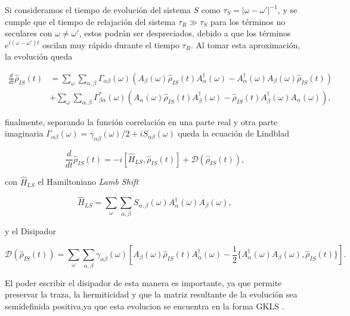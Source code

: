 Si consideramos el tiempo de evolución del sistema $S$ como $\tau_{S}=|\omega-\omega'|^{-1}$, y se cumple que el tiempo de relajación del sistema $\tau_{R}\gg \tau_{S}$ para los términos no seculares con $\omega \neq \omega'$, estos podrán ser despreciados, debido a que los términos $e^{i(\omega-\omega')t}$ oscilan muy rápido durante el tiempo $\tau_{R}$. Al tomar esta aproximación, la evolución queda

\begin{align*}
    \frac{d}{dt}\hat{\rho}_{IS}(t) & = \sum_{\omega}\sum_{\alpha,\beta} \Gamma_{\alpha \beta}(\omega)\left(A_{\beta}(\omega)\hat{\rho}_{IS}(t)A^{\dagger}_{\alpha}(\omega) - A^{\dagger}_{\alpha}(\omega)A_{\beta}(\omega) \hat{\rho}_{IS}(t) \right) \\
    & + \sum_{\omega}\sum_{\alpha,\beta} \Gamma^{*}_{\beta \alpha}(\omega) \left(A_{\alpha}(\omega)\hat{\rho}_{IS}(t)A^{\dagger}_{\beta}(\omega) - \hat{\rho}_{IS}(t)A^{\dagger}_{\beta}(\omega)A_{\alpha}(\omega) \right),
\end{align*}

finalmente, separando la función correlación en una parte real y otra parte imaginaria $\Gamma_{\alpha \beta}(\omega) = \gamma_{\alpha \beta}(\omega)/2 + iS_{\alpha \beta}(\omega)$ queda la ecuación de Lindblad 

\begin{equation}
    \frac{d}{dt} \hat{\rho}_{IS}(t) = -i[\hat{H}_{LS},\hat{\rho}_{IS}(t)] + \mathcal{D}(\hat{\rho}_{IS}(t)),
    \label{seclindbladfinal}
\end{equation}

con $\hat{H}_{LS}$ el Hamiltoniano \textit{Lamb Shift}

\begin{equation*}
    \hat{H}_{LS} = \sum_{\omega} \sum_{\alpha,\beta} S_{\alpha,\beta}(\omega)A^{\dagger}_{\alpha}(\omega)A_{\beta}(\omega), 
\end{equation*}

y el Disipador

\begin{equation*}
    \mathcal{D}(\hat{\rho}_{IS}(t)) = \sum_{\omega}\sum_{\alpha,\beta} \gamma_{\alpha \beta}(\omega) \left[ A_{\beta}(\omega)\hat{\rho}_{IS}(t)A^{\dagger}_{\alpha}(\omega) - \frac{1}{2}\{A^{\dagger}_{\alpha}(\omega)A_{\beta}(\omega), \hat{\rho}_{IS}(t)  \} \right].
\end{equation*}

El poder escribir el disipador de esta manera es importante, ya que permite preservar la traza, la hermiticidad y que la matriz resultante de la evolución sea semidefinida positiva,ya que esta evolucion se encuentra en la forma GKLS \cite{manzano2020short}.

